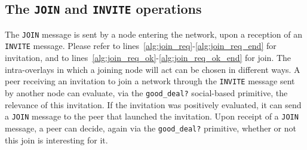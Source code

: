 \subsection{The \texttt{JOIN} and \texttt{INVITE} operations}
%
The {\tt JOIN} message is sent by a node entering the network, upon a
reception of an {\tt INVITE} message. Please refer to
lines~\ref{alg:join_req}-\ref{alg:join_req_end} for invitation, and to
lines~\ref{alg:join_req_ok}-\ref{alg:join_req_ok_end} for join. The
intra-overlays in which a joining node will act can be chosen in
different ways. A peer receiving an invitation to join a network
through the {\tt INVITE} message sent by another node can evaluate,
via the {\tt good\_deal?}  social-based primitive, the relevance of
this invitation. If the invitation was positively evaluated, it can
send a {\tt JOIN} message to the peer that launched the
invitation. Upon receipt of a {\tt JOIN} message, a peer can decide,
again via the {\tt good\_deal?}  primitive, whether or not this join
is interesting for it.


%


